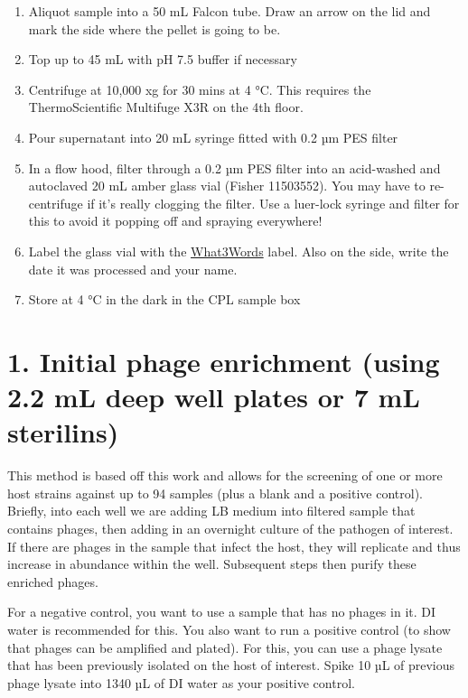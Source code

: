 \documentclass[
]{book}
\providecommand{\tightlist}{%
  \setlength{\itemsep}{0pt}\setlength{\parskip}{0pt}}
\begin{document}
\begin{enumerate}
\def\labelenumi{\arabic{enumi}.}
\tightlist
\item
  Aliquot sample into a 50 mL Falcon tube. Draw an arrow on the lid and mark the side where the pellet is going to be.
\item
  Top up to 45 mL with pH 7.5 buffer if necessary
\item
  Centrifuge at 10,000 xg for 30 mins at 4 °C. This requires the ThermoScientific Multifuge X3R on the 4th floor.
\item
  Pour supernatant into 20 mL syringe fitted with 0.2 µm PES filter
\item
  In a flow hood, filter through a 0.2 µm PES filter into an acid-washed and autoclaved 20 mL amber glass vial (Fisher 11503552). You may have to re-centrifuge if it's really clogging the filter. Use a luer-lock syringe and filter for this to avoid it popping off and spraying everywhere!
\item
  Label the glass vial with the \href{https://what3words.com/}{What3Words} label. Also on the side, write the date it was processed and your name.
\item
  Store at 4 °C in the dark in the CPL sample box
  \newpage
\end{enumerate}

\hypertarget{initial-phage-enrichment-using-2.2-ml-deep-well-plates-or-7-ml-sterilins}{%
\section{1. Initial phage enrichment (using 2.2 mL deep well plates or 7 mL sterilins)}\label{initial-phage-enrichment-using-2.2-ml-deep-well-plates-or-7-ml-sterilins}}

This method is based off this work \citep{Olsen2020-dh} and allows for the screening of one or more host strains against up to 94 samples (plus a blank and a positive control). Briefly, into each well we are adding LB medium into filtered sample that contains phages, then adding in an overnight culture of the pathogen of interest. If there are phages in the sample that infect the host, they will replicate and thus increase in abundance within the well. Subsequent steps then purify these enriched phages.

For a negative control, you want to use a sample that has no phages in it. DI water is recommended for this. You also want to run a positive control (to show that phages can be amplified and plated). For this, you can use a phage lysate that has been previously isolated on the host of interest. Spike 10 µL of previous phage lysate into 1340 µL of DI water as your positive control.
\end{document}
